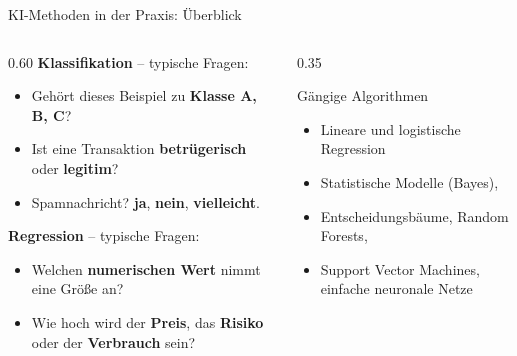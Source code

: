 \begin{frame}{KI-Methoden in der Praxis: Überblick}
  \begin{columns}
    \begin{column}{0.60\linewidth}
      \textbf{Klassifikation} -- typische Fragen:
      \begin{itemize}
        \item Gehört dieses Beispiel zu \textbf{Klasse A, B, C}?
        \item Ist eine Transaktion \textbf{betrügerisch} oder \textbf{legitim}?
        \item Spamnachricht? \textbf{ja}, \textbf{nein}, \textbf{vielleicht}.  
      \end{itemize}

      \vspace{0.5em}

      \textbf{Regression} -- typische Fragen:
      \begin{itemize}
        \item Welchen \textbf{numerischen Wert} nimmt eine Größe an?
        \item Wie hoch wird der \textbf{Preis}, das \textbf{Risiko} oder der \textbf{Verbrauch} sein?
      \end{itemize}
    \end{column}
    \begin{column}{0.35\linewidth}
      \begin{block}{Gängige Algorithmen}
        \begin{itemize}
          \item Lineare und logistische Regression
          \item Statistische Modelle (Bayes),
          \item Entscheidungsbäume, Random Forests, 
          \item Support Vector Machines, einfache neuronale Netze
        \end{itemize}
      \end{block}

    \end{column}
  \end{columns}
\end{frame}

